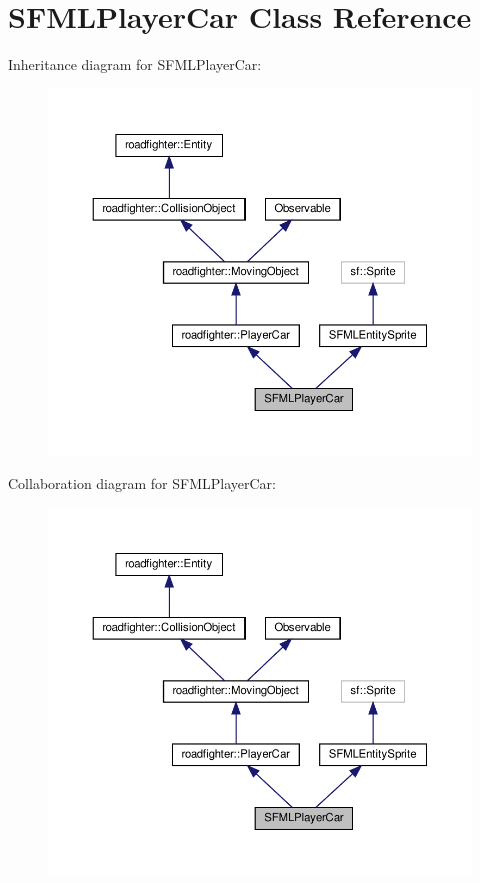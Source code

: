 \hypertarget{classSFMLPlayerCar}{}\section{S\+F\+M\+L\+Player\+Car Class Reference}
\label{classSFMLPlayerCar}


Inheritance diagram for S\+F\+M\+L\+Player\+Car\+:\nopagebreak
\begin{figure}[H]
\begin{center}
\leavevmode
\includegraphics[width=350pt]{classSFMLPlayerCar__inherit__graph}
\end{center}
\end{figure}


Collaboration diagram for S\+F\+M\+L\+Player\+Car\+:\nopagebreak
\begin{figure}[H]
\begin{center}
\leavevmode
\includegraphics[width=350pt]{classSFMLPlayerCar__coll__graph}
\end{center}
\end{figure}
